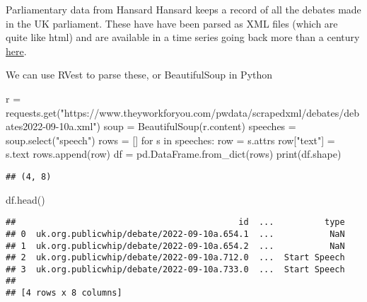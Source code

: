\documentclass[
  10pt,
  ignorenonframetext,
  aspectratio=169]{beamer}
\newenvironment{Shaded}{\begin{snugshade}}{\end{snugshade}}
\newcommand{\BuiltInTok}[1]{\textcolor[rgb]{0.80,0.80,0.80}{#1}}
\newcommand{\ControlFlowTok}[1]{\textcolor[rgb]{0.94,0.87,0.69}{#1}}
\newcommand{\KeywordTok}[1]{\textcolor[rgb]{0.94,0.87,0.69}{#1}}
\newcommand{\NormalTok}[1]{\textcolor[rgb]{0.80,0.80,0.80}{#1}}
\newcommand{\OperatorTok}[1]{\textcolor[rgb]{0.94,0.94,0.82}{#1}}
\newcommand{\StringTok}[1]{\textcolor[rgb]{0.80,0.58,0.58}{#1}}
\begin{document}
\begin{frame}[fragile]{Parliamentary data from Hansard}
\protect\hypertarget{parliamentary-data-from-hansard-1}{}
Hansard keeps a record of all the debates made in the UK parliament.
These have have been parsed as XML files (which are quite like html) and
are available in a time series going back more than a century
\href{https://parser.theyworkforyou.com/hansard.html}{here}.

We can use RVest to parse these, or BeautifulSoup in Python

\scriptsize

\begin{Shaded}
\begin{Highlighting}[]

\NormalTok{r }\OperatorTok{=}\NormalTok{ requests.get(}\StringTok{"https://www.theyworkforyou.com/pwdata/scrapedxml/debates/debates2022{-}09{-}10a.xml"}\NormalTok{)}
\NormalTok{soup }\OperatorTok{=}\NormalTok{ BeautifulSoup(r.content)}
\NormalTok{speeches }\OperatorTok{=}\NormalTok{ soup.select(}\StringTok{"speech"}\NormalTok{)}
\NormalTok{rows }\OperatorTok{=}\NormalTok{ []}
\ControlFlowTok{for}\NormalTok{ s }\KeywordTok{in}\NormalTok{ speeches:}
\NormalTok{    row }\OperatorTok{=}\NormalTok{ s.attrs}
\NormalTok{    row[}\StringTok{"text"}\NormalTok{] }\OperatorTok{=}\NormalTok{ s.text}
\NormalTok{    rows.append(row)}
\NormalTok{df }\OperatorTok{=}\NormalTok{ pd.DataFrame.from\_dict(rows)}
\BuiltInTok{print}\NormalTok{(df.shape)}
\end{Highlighting}
\end{Shaded}

\begin{verbatim}
## (4, 8)
\end{verbatim}

\begin{Shaded}
\begin{Highlighting}[]
\NormalTok{df.head()}
\end{Highlighting}
\end{Shaded}

\begin{verbatim}
##                                            id  ...          type
## 0  uk.org.publicwhip/debate/2022-09-10a.654.1  ...           NaN
## 1  uk.org.publicwhip/debate/2022-09-10a.654.2  ...           NaN
## 2  uk.org.publicwhip/debate/2022-09-10a.712.0  ...  Start Speech
## 3  uk.org.publicwhip/debate/2022-09-10a.733.0  ...  Start Speech
## 
## [4 rows x 8 columns]
\end{verbatim}
\end{frame}
\end{document}
